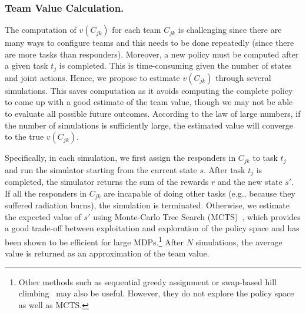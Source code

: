 \subsubsection{Team Value Calculation.}
The computation of  $v(C_{jk})$ for each team $C_{jk}$ is
challenging since there are many ways to configure teams and this needs to be done repeatedly (since there are more tasks than responders).
Moreover, a new policy must be computed after a given task $t_j$ is completed. This is time-consuming given the number of
states and joint actions. Hence, we propose to estimate
$v(C_{jk})$ through several simulations. This saves
computation as it avoids computing the complete policy to come
up with a good estimate of the team value, though we may not be
able to evaluate all possible future outcomes. According to the
law of large numbers, if the number of simulations is sufficiently
large, the estimated value will converge to the true $v(C_{jk})$.

Specifically, in each simulation, we first assign the responders in
$C_{jk}$ to task $t_j$ and run the simulator starting from the
current state $s$. After task $t_j$ is completed, the simulator
returns the sum of the rewards $r$ and the new state $s'$. If all
the responders in $C_{jk}$ are incapable of doing other tasks
(e.g., because they suffered radiation burns), the simulation is terminated. Otherwise, we estimate the expected value of $s'$ using Monte-Carlo
Tree Search (MCTS)~\cite{kocsis2006bandit}, which provides a good
trade-off between exploitation and exploration of the policy space
and has been shown to be efficient for large MDPs.\footnote{Other
methods such as sequential greedy assignment or swap-based hill
climbing~\cite{proper2009solving} may also be useful. However, they
do not explore the policy space as well as MCTS.} After $N$
simulations, the average value is returned as an approximation of
the team value.

